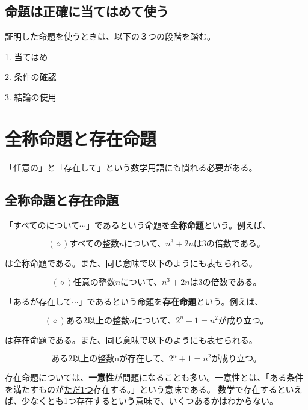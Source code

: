 \documentclass{jlreq}
\begin{document}
\subsection{命題は正確に当てはめて使う}
証明した命題を使うときは、以下の３つの段階を踏む。

1. 当てはめ

2. 条件の確認

3. 結論の使用

\newpage

\section{全称命題と存在命題}
「任意の」と「存在して」という数学用語にも慣れる必要がある。

\subsection{全称命題と存在命題}

「すべての\triangle \triangle について$\cdots$」であるという命題を\textbf{全称命題}という。例えば、

\begin{equation*}
  (\diamond) \text{すべての整数} n \text{について、}n^3 + 2n\text{は3の倍数である。}
\end{equation*}

は全称命題である。また、同じ意味で以下のようにも表せられる。

\begin{equation*}
  (\diamond) \text{任意の整数} n \text{について、}n^3 + 2n\text{は3の倍数である。}
\end{equation*}

「ある\triangle \triangle が存在して$\cdots$」であるという命題を\textbf{存在命題}という。例えば、

\begin{equation*}
  (\diamond) \text{ある2以上の整数} n \text{について、}2^n + 1 = n^2\text{が成り立つ。}
\end{equation*}

は存在命題である。また、同じ意味で以下のようにも表せられる。

\begin{equation*}
  \text{ある2以上の整数nが存在して、}2^n + 1 = n^2\text{が成り立つ。}
\end{equation*}

存在命題については、\textbf{一意性}が問題になることも多い。一意性とは、「ある条件を満たすものが\underline{ただ1つ}存在する。」という意味である。
数学で存在するといえば、少なくとも1つ存在するという意味で、いくつあるかはわからない。
\end{document}
